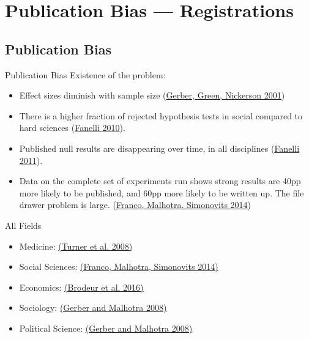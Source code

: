 \documentclass{beamer}
\begin{document}
\section{Publication Bias --- Registrations}

\subsection*{Publication Bias}
\begin{frame}{Publication Bias}%
  Existence of the problem:
  \begin{itemize}
  \item
 Effect sizes diminish with sample size (\href{http://pan.oxfordjournals.org/content/9/4/385.short}{Gerber, Green, Nickerson 2001})
  \item
  There is a higher fraction of rejected hypothesis tests in social compared to hard sciences (\href{http://journals.plos.org/plosone/article?id=10.1371/journal.pone.0010068}{Fanelli 2010}).
  \item
  	Published null results are disappearing over time, in all disciplines (\href{http://link.springer.com/article/10.1007/s11192-011-0494-7}{Fanelli 2011}). 
  \item
  	Data on the complete set of experiments run shows strong results are 40pp more likely to be published, and 60pp more likely to be written up. The file drawer problem is large. (\href{http://science.sciencemag.org/content/345/6203/1502}{Franco, Malhotra, Simonovits 2014})
  \end{itemize}
\end{frame}


\begin{frame}{All Fields}
\begin{itemize}[<.->]
\item Medicine: \href{http://www.nejm.org/doi/full/10.1056/nejmsa065779}{(Turner et al. 2008)}
\item Social Sciences: \href{http://science.sciencemag.org/content/345/6203/1502.short}{(Franco, Malhotra, Simonovits 2014)}
\item Economics: \href{https://www.aeaweb.org/articles.php?doi=10.1257/app.20150044}{(Brodeur et al. 2016)}
\item Sociology: \href{http://smr.sagepub.com/content/37/1/3.short}{(Gerber and Malhotra 2008)}
\item Political Science: \href{http://nowpublishers.com/article/Details/QJPS-8024}{(Gerber and Malhotra 2008)}
\end{itemize}
\end{frame}
\end{document}
